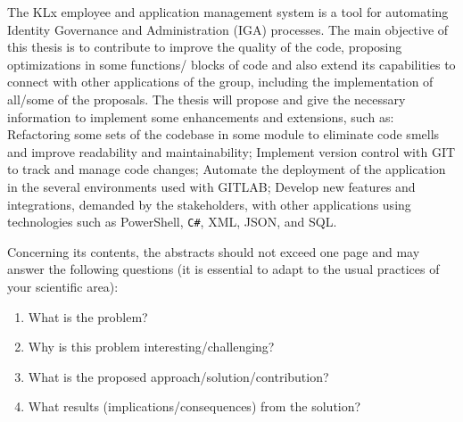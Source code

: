 
%

The KLx employee and application management system is a tool for automating Identity Governance and Administration (IGA) processes. The main objective of this thesis is to contribute to improve the quality of the code, proposing optimizations in some functions/ blocks of code and also extend its capabilities to connect with other applications of the group, including the implementation of all/some of the proposals. The thesis will propose and give the necessary information to implement some enhancements and extensions, such as: Refactoring some sets of the codebase in some module to eliminate code smells and improve readability and maintainability; Implement version control with GIT to track and manage code changes; Automate the deployment of the application in the several environments used with GITLAB; Develop new features and integrations, demanded by the stakeholders, with other applications using technologies such as PowerShell, \Verb!C#!, XML, JSON, and SQL.

Concerning its contents, the abstracts should not exceed one page and may answer the following questions (it is essential to adapt to the usual practices of your scientific area):

\begin{enumerate}
  \item What is the problem?
  \item Why is this problem interesting/challenging?
  \item What is the proposed approach/solution/contribution?
  \item What results (implications/consequences) from the solution?
\end{enumerate}


